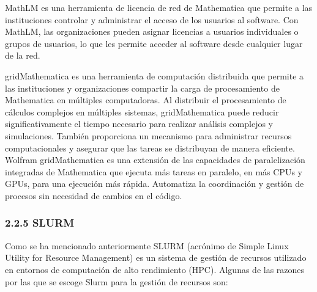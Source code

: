 \begin{doublespace}
    MathLM es una herramienta de licencia de red de Mathematica que permite a las instituciones controlar y administrar el acceso de los usuarios al software. Con MathLM, las organizaciones pueden asignar licencias a usuarios individuales o grupos de usuarios, lo que les permite acceder al software desde cualquier lugar de la red. \cite{Wolfram-mathlm-1}
    
    gridMathematica es una herramienta de computación distribuida que permite a las instituciones y organizaciones compartir la carga de procesamiento de Mathematica en múltiples computadoras. Al distribuir el procesamiento de cálculos complejos en múltiples sistemas, gridMathematica puede reducir significativamente el tiempo necesario para realizar análisis complejos y simulaciones. También proporciona un mecanismo para administrar recursos computacionales y asegurar que las tareas se distribuyan de manera eficiente. Wolfram gridMathematica es una extensión de las capacidades de paralelización integradas de Mathematica que ejecuta más tareas en paralelo, en más CPUs y GPUs, para una ejecución más rápida. Automatiza la coordinación y gestión de procesos sin necesidad de cambios en el código. \cite{Wolfram-grid-1}

    \subsubsection{2.2.5 SLURM}

    Como se ha mencionado anteriormente SLURM (acrónimo de Simple Linux Utility for Resource Management) es un sistema de gestión de recursos utilizado en entornos de computación de alto rendimiento (HPC). Algunas de las razones por las que se escoge Slurm para la gestión de recursos son:


\end{doublespace}
